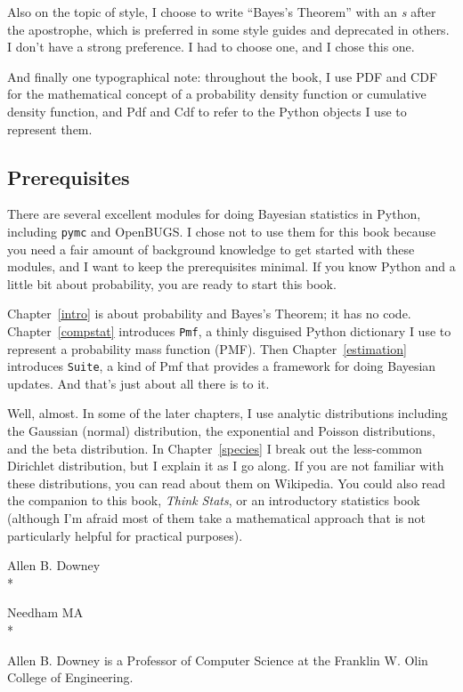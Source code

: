 \documentclass[12pt]{book}
\begin{document}
Also on the topic of style, I choose to write ``Bayes's Theorem''
with an {\it s} after the apostrophe, which is preferred in some
style guides and deprecated in others.  I don't have a strong
preference.  I had to choose one, and I chose this one.

And finally one typographical note: throughout the book, I use
PDF and CDF for the mathematical concept of a probability
density function or cumulative density function, and Pdf and Cdf
to refer to the Python objects I use to represent them.


\subsection*{Prerequisites}

There are several excellent modules for doing Bayesian statistics in
Python, including {\tt pymc} and OpenBUGS.  I chose not to use them
for this book because you need a fair amount of background knowledge
to get started with these modules, and I want to keep the
prerequisites minimal.  If you know Python and a little bit about
probability, you are ready to start this book.

Chapter~\ref{intro} is about probability and Bayes's Theorem; it has
no code.  Chapter~\ref{compstat} introduces {\tt Pmf}, a thinly disguised
Python dictionary I use to represent a probability mass function
(PMF).  Then Chapter~\ref{estimation} introduces {\tt Suite}, a kind
of Pmf that provides a framework for doing Bayesian updates.  And
that's just about all there is to it.

Well, almost.  In some of the later chapters, I use
analytic distributions including the Gaussian (normal) distribution,
the exponential and Poisson distributions, and the beta distribution.
In Chapter~\ref{species} I break out the less-common Dirichlet
distribution, but I explain it as I go along.  If you are not familiar
with these distributions, you can read about them on Wikipedia.  You
could also read the companion to this book, {\it Think Stats}, or an
introductory statistics book (although I'm afraid most of them take
a mathematical approach that is not particularly helpful for practical
purposes).


Allen B. Downey \\*

Needham MA \\*

Allen B. Downey is a Professor of Computer Science at 
the Franklin W. Olin College of Engineering.
\end{document}
